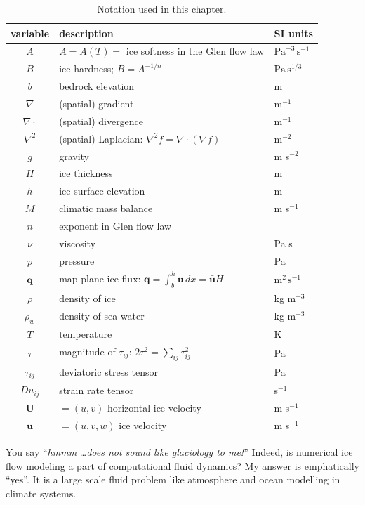 \documentclass[titlepage,letterpaper,final,12pt]{scrartcl}
\newcommand{\bq}{\mathbf{q}}
\begin{document}
\begin{table}%
\caption{Notation used in this chapter.}
\label{tab:notation}
\begin{tabular}{cll}
variable  & description & SI units \\ 
\hline
$A$ & $A=A(T)=$ ice softness in the Glen flow law & $\text{Pa}^{-3}\,\text{s}^{-1}$ \\
$B$ & ice hardness; $B=A^{-1/n}$ & $\text{Pa}\,\text{s}^{1/3}$ \\
$b$ & bedrock elevation & m \\
$\nabla$ & (spatial) gradient & m$^{-1}$ \\
$\nabla\cdot$ & (spatial) divergence & m$^{-1}$ \\
$\nabla^2$ & (spatial) Laplacian: $\nabla^2 f = \nabla\cdot(\nabla f)$ & m$^{-2}$ \\
$g$ & gravity & m s$^{-2}$ \\
$H$ & ice thickness & m \\
$h$ & ice surface elevation & m \\
$M$ & climatic mass balance & m s$^{-1}$ \\
$n$ & exponent in Glen flow law & \\
$\nu$ & viscosity & Pa s \\
$p$ & pressure & Pa \\
$\bq$ & map-plane ice flux: $\bq = \int_{b}^{h} \mathbf{u}\,dx = \bar{\mathbf{u}} H$ & $\text{m}^2\,\text{s}^{-1}$ \\
$\rho$ & density of ice & kg m$^{-3}$ \\
$\rho_w$ & density of sea water & kg m$^{-3}$ \\
$T$ & temperature & K \\
$\tau$ & magnitude of $\tau_{ij}$: $2 \tau^2 = \sum_{ij} \tau_{ij}^2$ & Pa \\
$\tau_{ij}$ & deviatoric stress tensor & Pa \\
$Du_{ij}$ & strain rate tensor & s$^{-1}$ \\
$\mathbf{U}$ & $=(u,v)$ horizontal ice velocity & m s$^{-1}$ \\
$\mathbf{u}$ & $=(u,v,w)$ ice velocity & m s$^{-1}$ \\
\end{tabular}
\end{table}

You say ``\emph{hmmm} \dots \emph{does not sound like glaciology to me!}''  Indeed, is numerical ice flow modeling a part of computational fluid dynamics?  My answer is emphatically ``yes''.  It is a large scale fluid problem like atmosphere and ocean modelling in climate systems.
\end{document}
